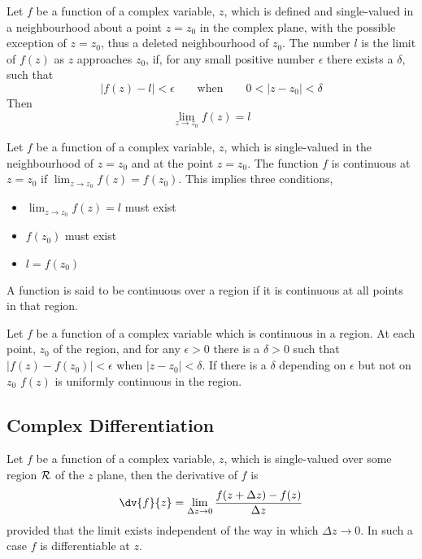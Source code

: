 \begin{definition}
  Let $f$ be a function of a complex variable, $z$, which is defined
  and single-valued in a neighbourhood about a point $z=z_0$ in the
  complex plane, with the possible exception of $z = z_0$, thus a
  deleted neighbourhood of $z_0$. The number $l$ is the limit of
  $f(z)$ as $z$ approaches $z_0$, if, for any small positive number
  $\epsilon$ there exists a $\delta$, such that \[ | f(z) - l | <
  \epsilon \qquad \text{when} \qquad 0 < |z - z_0 | <
  \delta \] Then \[ \lim_{z \to z_0} f(z) = l \]
\end{definition}
\begin{definition}[Continuity]
  Let $f$ be a function of a complex variable, $z$, which is
  single-valued in the neighbourhood of $z=z_0$ and at the point
  $z=z_0$. The function $f$ is continuous at $z=z_0$ if $\lim_{z \to
    z_0} f(z) = f(z_0)$. This implies three conditions,
  \begin{itemize}
  \item $\lim_{z \to z_0} f(z) = l$ must exist
  \item $f(z_0)$ must exist
  \item $l = f(z_0)$
  \end{itemize}
\end{definition}
\begin{definition}
  A function is said to be continuous over a region if it is
  continuous at all points in that region. 
\end{definition}
\begin{definition}
  Let $f$ be a function of a complex variable which is continuous in a
  region. At each point, $z_0$ of the region, and for any $\epsilon
  >0$ there is a $\delta >0$ such that $|f(z) - f(z_0)| < \epsilon$
  when $|z - z_0| < \delta$. If there is a $\delta$ depending on
  $\epsilon$ but not on $z_0$ $f(z)$ is uniformly continuous in the
  region.
\end{definition}

\subsection{Complex Differentiation}
\label{sec:complexdiff}

\begin{definition}[Differentiation]
  Let $f$ be a function of a complex variable, $z$, which is
  single-valued over some region ${\cal R}$ of the $z$ plane, then the
  derivative of $f$ is
  \[ \dv{f}{z} = \lim_{\Delta z \to 0} \frac{f(z + \Delta z) -
    f(z)}{\Delta z} \] provided that the limit exists independent of
  the way in which $\Delta z \to 0$. In such a case $f$ is
  differentiable at $z$.
\end{definition}

